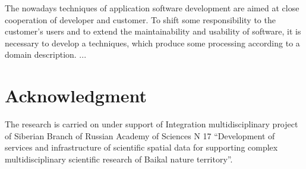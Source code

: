 \documentclass[conference]{IEEEtran}
\begin{document}
The nowadays techniques of application software development are aimed at close cooperation of developer and customer.  To shift some responsibility to the customer's users and to extend the maintainability and usability of software, it is necessary to develop a techniques, which produce some processing according to a domain description.  ...



\section*{Acknowledgment}
The research is carried on under support of Integration multidisciplinary project of Siberian Branch of Russian Academy of Sciences N 17 “Development of services and infrastructure of scientific spatial data for supporting complex multidisciplinary scientific research of Baikal nature territory”.



\end{document}

